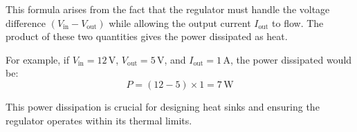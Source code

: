 This formula arises from the fact that the regulator must handle the voltage difference \( (V_{\text{in}} - V_{\text{out}}) \) while allowing the output current \( I_{\text{out}} \) to flow. The product of these two quantities gives the power dissipated as heat.

For example, if \( V_{\text{in}} = 12 \, \text{V} \), \( V_{\text{out}} = 5 \, \text{V} \), and \( I_{\text{out}} = 1 \, \text{A} \), the power dissipated would be:
\[
P = (12 - 5) \times 1 = 7 \, \text{W}
\]

This power dissipation is crucial for designing heat sinks and ensuring the regulator operates within its thermal limits.

